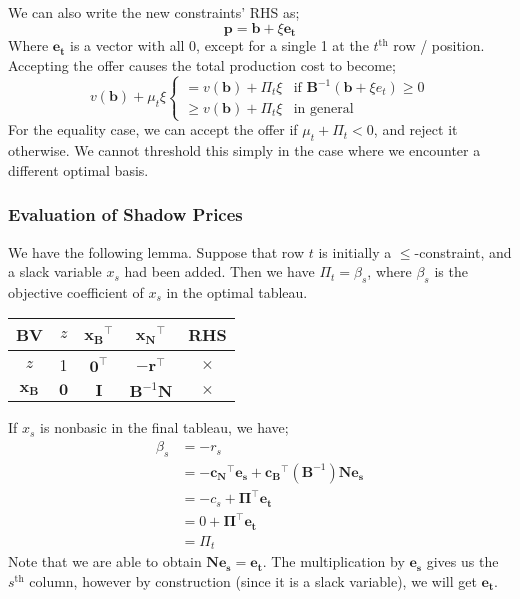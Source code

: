 \documentclass[a4paper, 12pt]{article}
\newcommand{\mat}[1]{\boldsymbol{#1}}
\renewcommand{\vec}[1]{\boldsymbol{#1}}
\begin{document}
                We can also write the new constraints' RHS as;
                $$\vec{p} = \vec{b} + \xi\vec{e_t}$$
                Where $\vec{e_t}$ is a vector with all 0, except for a single 1 at the $t^\text{th}$ row / position.
                Accepting the offer causes the total production cost to become;
                $$v(\vec{b}) + \mu_t\xi \begin{cases}
                    = v(\vec{b}) + \Pi_t\xi & \text{if } \mat{B}^{-1}(\vec{b} + \xi e_t) \geq 0 \\
                    \geq v(\vec{b}) + \Pi_t\xi & \text{in general}
                \end{cases}$$
                For the equality case, we can accept the offer if $\mu_t + \Pi_t < 0$, and reject it otherwise.
                We cannot threshold this simply in the case where we encounter a different optimal basis.
            \subsubsection*{Evaluation of Shadow Prices}
                We have the following lemma.
                Suppose that row $t$ is initially a $\leq$-constraint, and a slack variable $x_s$ had been added.
                Then we have $\Pi_t = \beta_s$, where $\beta_s$ is the objective coefficient of $x_s$ in the optimal tableau.
                \begin{center}
                    \begin{tabular}{c|ccc|c}
                        BV & $z$ & $\vec{x_B}^\top$ & $\vec{x_N}^\top$ & RHS \\
                        \hline
                        $z$ & 1 & $\vec{0}^\top$ & $-\vec{r}^\top$ & $\times$ \\
                        $\vec{x_B}$ & $\vec{0}$ & $\mat{I}$ & $\mat{B}^{-1}\mat{N}$ & $\times$
                    \end{tabular}
                \end{center}
                If $x_s$ is nonbasic in the final tableau, we have;
                \begin{align*}
                    \beta_s & = -r_s \\
                    & = -\vec{c_N}^\top\vec{e_s} + \vec{c_B}^\top\left(\mat{B}^{-1}\right)\mat{N}\vec{e_s} \\
                    & = -c_s + \vec{\Pi}^\top\vec{e_t} \\
                    & = 0 + \vec{\Pi}^\top\vec{e_t} \\
                    & = \Pi_t
                \end{align*}
                Note that we are able to obtain $\mat{N}\vec{e_s} = \vec{e_t}$.
                The multiplication by $\vec{e_s}$ gives us the $s^\text{th}$ column, however by construction (since it is a slack variable), we will get $\vec{e_t}$.
                \medskip
\end{document}
